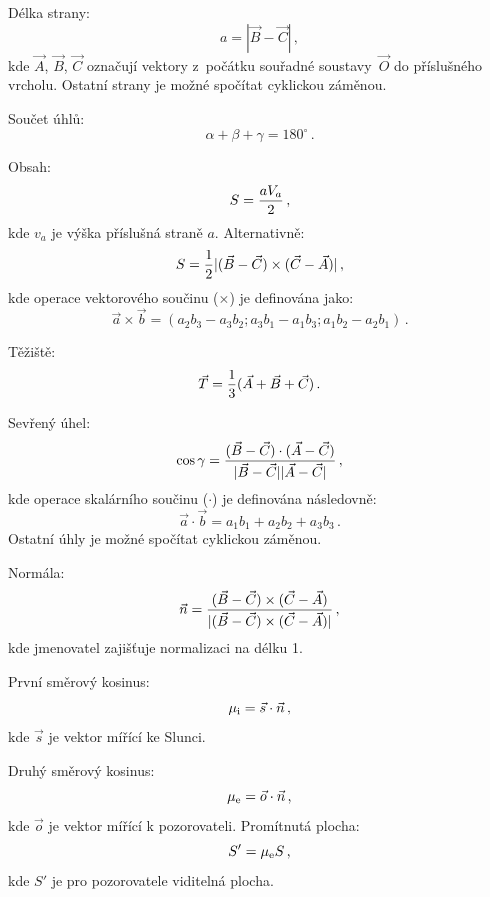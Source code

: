 \documentclass[11pt]{article}
\begin{document}
Délka strany:
\begin{equation}
a = |\vec B - \vec C|\,,
\end{equation}
kde $\vec A$, $\vec B$, $\vec C$ označují vektory z~počátku souřadné soustavy~$\vec O$ do příslušného vrcholu.
Ostatní strany je možné spočítat cyklickou záměnou.

Součet úhlů:
\begin{equation}
\alpha + \beta + \gamma = 180^\circ\,.
\end{equation}

Obsah:
\begin{equation}
S = {a V_a\over 2}\,,
\end{equation}
kde $v_a$ je výška příslušná straně $a$.
Alternativně:
\begin{equation}
S = {1\over 2}|(\vec B-\vec C) \times (\vec C-\vec A)|\,,
\end{equation}
kde operace vektorového součinu ($\times$) je definována jako:
\begin{equation}
\vec a\times\vec b = (a_2 b_3 - a_3 b_2; a_3 b_1 - a_1 b_3; a_1 b_2 - a_2 b_1)\,.
\end{equation}

Těžiště:
\begin{equation}
\vec T = {1\over 3}(\vec A + \vec B + \vec C)\,.
\end{equation}

Sevřený úhel:
\begin{equation}
\cos\gamma = {(\vec B-\vec C)\cdot (\vec A-\vec C)\over |\vec B-\vec C| |\vec A-\vec C|}\,,
\end{equation}
kde operace skalárního součinu ($\cdot$) je definována následovně:
\begin{equation}
\vec a \cdot \vec b = a_1 b_1 + a_2 b_2 + a_3 b_3\,.
\end{equation}
Ostatní úhly je možné spočítat cyklickou záměnou.

Normála:
\begin{equation}
\vec n = {(\vec B-\vec C) \times (\vec C-\vec A)\over |(\vec B-\vec C) \times (\vec C-\vec A)|}\,,
\end{equation}
kde jmenovatel zajišťuje normalizaci na délku 1.

První směrový kosinus:
\begin{equation}
\mu_{\rm i} = \vec s\cdot \vec n\,,
\end{equation}
kde $\vec s$ je vektor mířící ke Slunci.

Druhý směrový kosinus:
\begin{equation}
\mu_{\rm e} = \vec o\cdot \vec n\,,
\end{equation}
kde $\vec o$ je vektor mířící k pozorovateli.
Promítnutá plocha:
\begin{equation}
S' = \mu_{\rm e} S\,,
\end{equation}
kde $S'$ je pro pozorovatele viditelná plocha.
\end{document}

